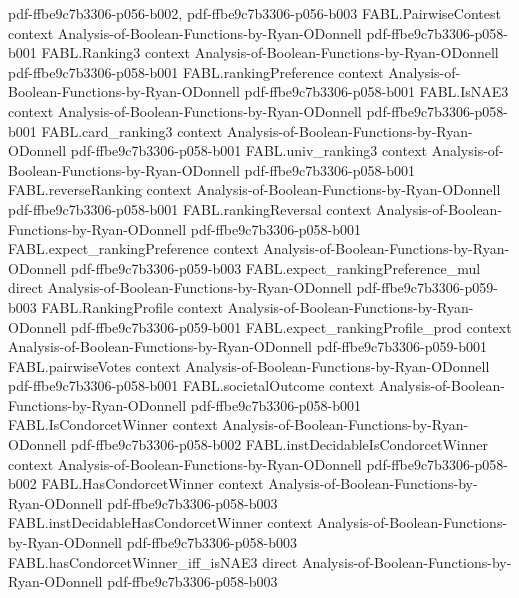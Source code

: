 \begin{theorem}
  {pdf-ffbe9c7b3306-p056-b002,
    pdf-ffbe9c7b3306-p056-b003}
\proofstep
  {FABL.PairwiseContest}
  {context}
  {Analysis-of-Boolean-Functions-by-Ryan-ODonnell}
  {pdf-ffbe9c7b3306-p058-b001}
\proofstep
  {FABL.Ranking3}
  {context}
  {Analysis-of-Boolean-Functions-by-Ryan-ODonnell}
  {pdf-ffbe9c7b3306-p058-b001}
\proofstep
  {FABL.rankingPreference}
  {context}
  {Analysis-of-Boolean-Functions-by-Ryan-ODonnell}
  {pdf-ffbe9c7b3306-p058-b001}
\proofstep
  {FABL.IsNAE3}
  {context}
  {Analysis-of-Boolean-Functions-by-Ryan-ODonnell}
  {pdf-ffbe9c7b3306-p058-b001}
\proofstep
  {FABL.card_ranking3}
  {context}
  {Analysis-of-Boolean-Functions-by-Ryan-ODonnell}
  {pdf-ffbe9c7b3306-p058-b001}
\proofstep
  {FABL.univ_ranking3}
  {context}
  {Analysis-of-Boolean-Functions-by-Ryan-ODonnell}
  {pdf-ffbe9c7b3306-p058-b001}
\proofstep
  {FABL.reverseRanking}
  {context}
  {Analysis-of-Boolean-Functions-by-Ryan-ODonnell}
  {pdf-ffbe9c7b3306-p058-b001}
\proofstep
  {FABL.rankingReversal}
  {context}
  {Analysis-of-Boolean-Functions-by-Ryan-ODonnell}
  {pdf-ffbe9c7b3306-p058-b001}
\proofstep
  {FABL.expect_rankingPreference}
  {context}
  {Analysis-of-Boolean-Functions-by-Ryan-ODonnell}
  {pdf-ffbe9c7b3306-p059-b003}
\proofstep
  {FABL.expect_rankingPreference_mul}
  {direct}
  {Analysis-of-Boolean-Functions-by-Ryan-ODonnell}
  {pdf-ffbe9c7b3306-p059-b003}
\proofstep
  {FABL.RankingProfile}
  {context}
  {Analysis-of-Boolean-Functions-by-Ryan-ODonnell}
  {pdf-ffbe9c7b3306-p059-b001}
\proofstep
  {FABL.expect_rankingProfile_prod}
  {context}
  {Analysis-of-Boolean-Functions-by-Ryan-ODonnell}
  {pdf-ffbe9c7b3306-p059-b001}
\proofstep
  {FABL.pairwiseVotes}
  {context}
  {Analysis-of-Boolean-Functions-by-Ryan-ODonnell}
  {pdf-ffbe9c7b3306-p058-b001}
\proofstep
  {FABL.societalOutcome}
  {context}
  {Analysis-of-Boolean-Functions-by-Ryan-ODonnell}
  {pdf-ffbe9c7b3306-p058-b001}
\proofstep
  {FABL.IsCondorcetWinner}
  {context}
  {Analysis-of-Boolean-Functions-by-Ryan-ODonnell}
  {pdf-ffbe9c7b3306-p058-b002}
\proofstep
  {FABL.instDecidableIsCondorcetWinner}
  {context}
  {Analysis-of-Boolean-Functions-by-Ryan-ODonnell}
  {pdf-ffbe9c7b3306-p058-b002}
\proofstep
  {FABL.HasCondorcetWinner}
  {context}
  {Analysis-of-Boolean-Functions-by-Ryan-ODonnell}
  {pdf-ffbe9c7b3306-p058-b003}
\proofstep
  {FABL.instDecidableHasCondorcetWinner}
  {context}
  {Analysis-of-Boolean-Functions-by-Ryan-ODonnell}
  {pdf-ffbe9c7b3306-p058-b003}
\proofstep
  {FABL.hasCondorcetWinner_iff_isNAE3}
  {direct}
  {Analysis-of-Boolean-Functions-by-Ryan-ODonnell}
  {pdf-ffbe9c7b3306-p058-b003}
\proofstep

\end{theorem}
